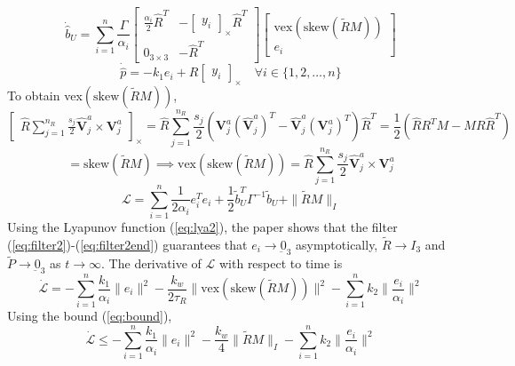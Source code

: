\documentclass[12pt]{article}
\def\cross#1{\begin{bmatrix} #1 \end{bmatrix}_\times}
\begin{document}
\begin{equation}
    \dot {\hat{b}}_U = \sum_{i=1}^{n} \frac{\Gamma}{\alpha_i}
    \begin{bmatrix}
        \frac{\alpha_i}{2} \hat R^T & -\cross{y_i} \hat R^T \\
        0_{3 \times 3} & - \hat R^T
    \end{bmatrix}
    \begin{bmatrix}
        \text{vex}(\text{skew}(\tilde{R}M)) \\
        e_i
    \end{bmatrix}
\end{equation}
\begin{equation} \label{eq:filter2end}
    \dot{\hat p} = -k_1 e_i + \hat R \cross{y_i} \quad \forall i \in \{1, 2, \ldots, n\}
\end{equation}
To obtain vex$(\text{skew}(\tilde RM))$,
\begin{equation*}
    \cross{\hat R \sum_{j=1}^{n_R} \frac{s_j}{2} \hat {\mathbf{V}}_j^a \times {\mathbf{V}}_j^a } 
    = \hat R \sum_{j=1}^{n_R} \frac{s_j}{2} ({\mathbf{V}}_j^a (\hat{\mathbf{V}}_j^a)^T - \hat{\mathbf{V}}_j^a ({\mathbf{V}}_j^a)^T) \hat R^T
    = \frac{1}{2}(\hat R R^T M - M R \hat R^T)
\end{equation*}
\begin{equation}
    = \text{skew}(\tilde{R}M) \implies \text{vex}(\text{skew}(\tilde RM)) = \hat R \sum_{j=1}^{n_R} \frac{s_j}{2} \hat {\mathbf{V}}_j^a \times {\mathbf{V}}_j^a 
\end{equation}
\begin{equation}\label{eq:lya2}
    \mathcal{L} = \sum_{i=1}^{n} \frac{1}{2 \alpha_i} e_i^Te_i + \frac{1}{2}\tilde{b}_U^T \Gamma^{-1}\tilde{b}_U + \|\tilde{R}M \|_I
\end{equation}
Using the Lyapunov function (\ref{eq:lya2}), the paper shows that the filter (\ref{eq:filter2})-(\ref{eq:filter2end}) guarantees that $e_i \rightarrow \underbar{0}_3$ asymptotically, $\tilde{R} \rightarrow I_3$ and $\tilde{P} \rightarrow \underbar{0}_3$ as $t \rightarrow \infty$. 
The derivative of $\mathcal{L}$ with respect to time is 
\begin{equation}
    \dot{\mathcal{L}} = -\sum_{i=1}^{n} \frac{k_1}{\alpha_i} \|e_i \|^2 
                        - \frac{k_w}{2\tau_R} \|\text{vex}(\text{skew}(\tilde RM)) \|^2 
                        -\sum_{i=1}^{n} k_2 \| \frac{e_i}{\alpha_i} \|^2 
\end{equation}
Using the bound (\ref{eq:bound}), 
\begin{equation}
    \dot{\mathcal{L}} \leq -\sum_{i=1}^{n} \frac{k_1}{\alpha_i} \|e_i \|^2 
    - \frac{k_w}{4} \|\tilde R M\|_I
    -\sum_{i=1}^{n} k_2 \| \frac{e_i}{\alpha_i} \|^2 
\end{equation}
\end{document}
